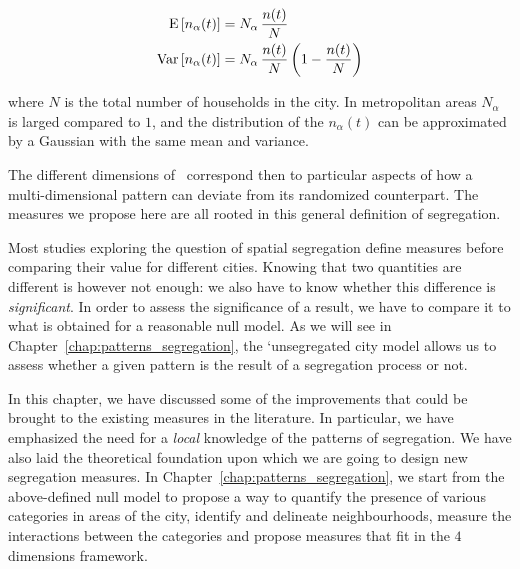 \begin{align}
    \begin{split}
	\mathrm{E} \left[ n_\alpha(t) \right] &= N_\alpha\,\frac{n(t)}{N} \\
	\mathrm{Var} \left[ n_\alpha(t) \right] &= N_\alpha\,\frac{n(t)}{N} \left( 1 - \frac{n(t)}{N}  \right) 
    \end{split}
\end{align}

where $N$ is the total number of households in the city. In metropolitan areas
$N_\alpha$ is larged compared to $1$, and the distribution of the $n_\alpha(t)$
can be approximated by a Gaussian with the same mean and variance.

The different dimensions of~\cite{Massey:1988,Reardon:2004} correspond then to
particular aspects of how a multi-dimensional pattern can deviate from its
randomized counterpart. The measures we propose here are all rooted in this
general definition of segregation.

Most studies exploring the question of spatial segregation define measures
before comparing their value for different cities. Knowing that two quantities
are different is however not enough: we also have to know whether this
difference is {\em significant}. In order to assess the significance of a
result, we have to compare it to what is obtained for a reasonable null model.
As we will see in Chapter~\ref{chap:patterns_segregation}, the 
`unsegregated city model allows us to assess whether a given pattern is
the result of a segregation process or not.\\

\bigskip

In this chapter, we have discussed some of the improvements that could be
brought to the existing measures in the literature. In particular, we have
emphasized the need for a \emph{local} knowledge of the patterns of segregation.
We have also laid the theoretical foundation upon which we are going to design
new segregation measures.
In Chapter~\ref{chap:patterns_segregation}, we start from the above-defined null
model to propose a way to quantify the presence of various categories in areas
of the city, identify and delineate neighbourhoods, measure the interactions
between the categories and propose measures that fit in the $4$ dimensions
framework.
